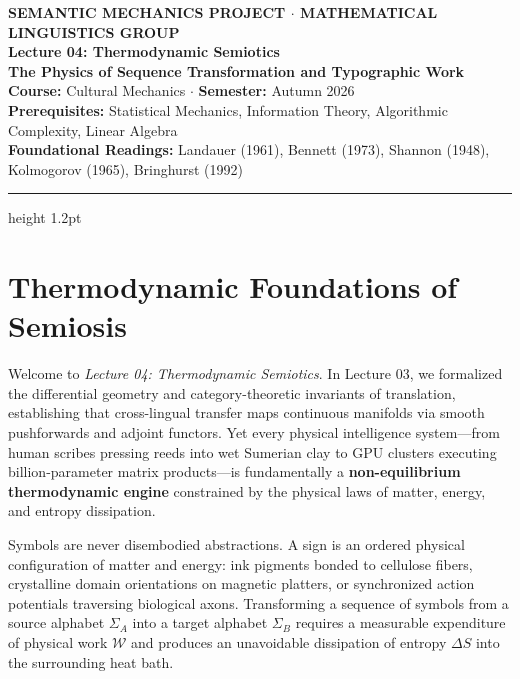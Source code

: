 \documentclass[11pt,letterpaper]{article}
\begin{document}
\begin{center}
    {\small\sffamily\bfseries\color{darkslate} SEMANTIC MECHANICS PROJECT $\cdot$ MATHEMATICAL LINGUISTICS GROUP}\\[0.7em]
    {\LARGE\bfseries\color{primaryblue} Lecture 04: Thermodynamic Semiotics}\\[0.35em]
    {\Large\bfseries\color{primaryblue} The Physics of Sequence Transformation and Typographic Work}\\[0.4em]
    {\normalsize\sffamily\color{darkslate} \textbf{Course:} Cultural Mechanics $\cdot$ \textbf{Semester:} Autumn 2026}\\[0.25em]
    {\small\sffamily\color{darkslate!80} \textbf{Prerequisites:} Statistical Mechanics, Information Theory, Algorithmic Complexity, Linear Algebra}\\[0.25em]
    {\small\sffamily\color{darkslate!80} \textbf{Foundational Readings:} Landauer (1961), Bennett (1973), Shannon (1948), Kolmogorov (1965), Bringhurst (1992)}
\end{center}
\vspace{0.1em}
\hrule height 1.2pt \vspace{0.7em}

\section{Thermodynamic Foundations of Semiosis}

Welcome to \textit{Lecture 04: Thermodynamic Semiotics}. In Lecture 03, we formalized the differential geometry and category-theoretic invariants of translation, establishing that cross-lingual transfer maps continuous manifolds via smooth pushforwards and adjoint functors. Yet every physical intelligence system---from human scribes pressing reeds into wet Sumerian clay to GPU clusters executing billion-parameter matrix products---is fundamentally a \textbf{non-equilibrium thermodynamic engine} constrained by the physical laws of matter, energy, and entropy dissipation.

Symbols are never disembodied abstractions. A sign is an ordered physical configuration of matter and energy: ink pigments bonded to cellulose fibers, crystalline domain orientations on magnetic platters, or synchronized action potentials traversing biological axons. Transforming a sequence of symbols from a source alphabet $\Sigma_A$ into a target alphabet $\Sigma_B$ requires a measurable expenditure of physical work $\mathcal{W}$ and produces an unavoidable dissipation of entropy $\Delta S$ into the surrounding heat bath.
\end{document}
